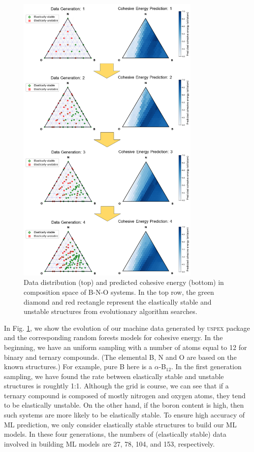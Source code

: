 	
	\begin{figure}[htbp]
        \centering
        \captionsetup{singlelinecheck = false, justification=justified}
        \includegraphics[width=0.8\textwidth]{BNO_2_data.png}
        \caption[Data distribution and predicted cohesive energy in composition space of B-N-O systems]{Data distribution (top) and predicted cohesive energy (bottom) in composition space of B-N-O systems. In the top row, the green diamond and red rectangle represent the elastically stable and unstable structures from evolutionary algorithm searches.}
        \label{BNO_2_data}
    \end{figure}
    \pagebreak

    In Fig. \ref{BNO_2_data}, we show the evolution of our machine data generated by \textsc{uspex} package and the corresponding random forests models for cohesive energy. In the beginning, we have an uniform sampling with a number of atoms equal to 12 for binary and ternary compounds. (The elemental B, N and O are based on the known structures.) For example, pure B here is a $\alpha$-B$_{12}$. In the first generation sampling, we have found the rate between elastically stable and unstable structures is roughtly 1:1. Although the grid is course, we can see that if a ternary compound is composed of mostly nitrogen and oxygen atoms, they tend to be elastically unstable. On the other hand, if the boron content is high, then such systems are more likely to be elastically stable. To ensure high accuracy of ML prediction, we only consider elastically stable structures to build our ML models. In these four generations, the numbers of (elastically stable) data involved in building ML models are 27, 78, 104, and 153, respectively.
    
